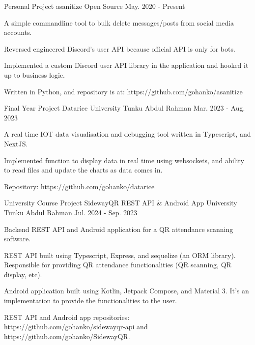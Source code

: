\begin{cventries}
  \cventry
    {Personal Project} %
    {asanitize} %
    {Open Source} %
    {May. 2020 - Present} %
    {
      \begin{cvitems} %
          \item {A simple commandline tool to bulk delete messages/posts from social media accounts.}
          \item {Reversed engineered Discord's user API because official API is only for bots.}
          \item {Implemented a custom Discord user API library in the application and hooked it up to business logic.}
          \item {Written in Python, and repository is at: https://github.com/gohanko/asanitize}
      \end{cvitems}
    }

  \cventry
    {Final Year Project} %
    {Datarice} %
    {University Tunku Abdul Rahman} %
    {Mar. 2023 - Aug. 2023} %
    {
      \begin{cvitems} %
          \item {A real time IOT data visualisation and debugging tool written in Typescript, and NextJS.}
          \item {Implemented function to display data in real time using websockets, and ability to read files and update the charts as data comes in.}
          \item {Repository: https://github.com/gohanko/datarice}
      \end{cvitems}
    }

  \cventry
    {University Course Project} %
    {SidewayQR REST API \& Android App} %
    {University Tunku Abdul Rahman} %
    {Jul. 2024 - Sep. 2023} %
    {
      \begin{cvitems} %
          \item {Backend REST API and Android application for a QR attendance scanning software.}
          \item {REST API built using Typescript, Express, and sequelize (an ORM library). Responsible for providing QR attendance functionalities (QR scanning, QR display, etc).}
          \item {Android application built using Kotlin, Jetpack Compose, and Material 3. It's an implementation to provide the functionalities to the user.}
          \item {REST API and Android app repositories: https://github.com/gohanko/sidewayqr-api and https://github.com/gohanko/SidewayQR.}
      \end{cvitems}
    }

\end{cventries}
